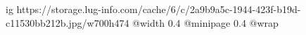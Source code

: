  
 
 
 
 

\ifcmt
  ig https://storage.lug-info.com/cache/6/c/2a9b9a5c-1944-423f-b19d-c11530bb212b.jpg/w700h474
  @width 0.4
  @minipage 0.4
  @wrap \parpic[r]
\fi
